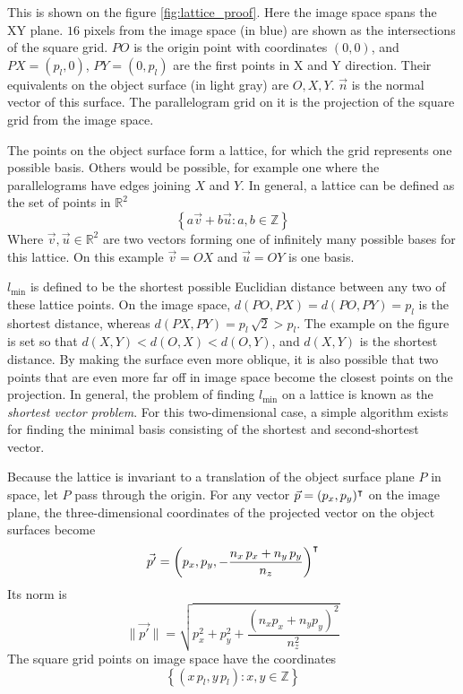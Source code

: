 This is shown on the figure \ref{fig:lattice_proof}. Here the image space spans the XY plane. $16$ pixels from the image space (in blue) are shown as the intersections of the square grid. $PO$ is the origin point with coordinates $(0, 0)$, and $PX = (p_l, 0)$, $PY = (0, p_l)$ are the first points in X and Y direction. Their equivalents on the object surface (in light gray) are $O, X, Y$. $\vec{n}$ is the normal vector of this surface. The parallelogram grid on it is the projection of the square grid from the image space.

The points on the object surface form a lattice, for which the grid represents one possible basis. Others would be possible, for example one where the parallelograms have edges joining $X$ and $Y$. In general, a lattice can be defined as the set of points in $\mathbb{R}^2$
\begin{equation}
\left\{ a \vec{v} + b \vec{u} : a,b \in \mathbb{Z} \right\}
\end{equation}
Where $\vec{v}, \vec{u} \in \mathbb{R}^2$ are two vectors forming one of infinitely many possible bases for this lattice. On this example $\vec{v} = OX$ and $\vec{u} = OY$ is one basis.

$l_\text{min}$ is defined to be the shortest possible Euclidian distance between any two of these lattice points. On the image space, $d(PO, PX) = d(PO, PY) = p_l$ is the shortest distance, whereas $d(PX, PY) = p_l \, \sqrt{2} > p_l$. The example on the figure is set so that $d(X, Y) < d(O, X) < d(O, Y)$, and $d(X, Y)$ is the shortest distance. By making the surface even more oblique, it is also possible that two points that are even more far off in image space become the closest points on the projection. In general, the problem of finding $l_\text{min}$ on a lattice is known as the \emph{shortest vector problem}. For this two-dimensional case, a simple algorithm exists for finding the minimal basis consisting of the shortest and second-shortest vector. \cite{Galb2012}

Because the lattice is invariant to a translation of the object surface plane $P$ in space, let $P$ pass through the origin. For any vector $\vec{p} = (p_x, p_y)^\intercal$ on the image plane, the three-dimensional coordinates of the projected vector on the object surfaces become
\begin{equation}
\vec{p'} = \left( p_x, p_y, - \frac{n_x \, p_x + n_y \, p_y}{n_z}  \right)^\intercal
\end{equation}
Its norm is
\begin{equation}
\| \vec{p'} \| = \sqrt{p^2_x + p^2_y + \frac{(n_x p_x + n_y p_y)^2}{n^2_z}}
\end{equation}
The square grid points on image space have the coordinates
\begin{equation}
\left\{ (x \, p_l, y \, p_l) : x,y \in \mathbb{Z} \right\}
\end{equation}

